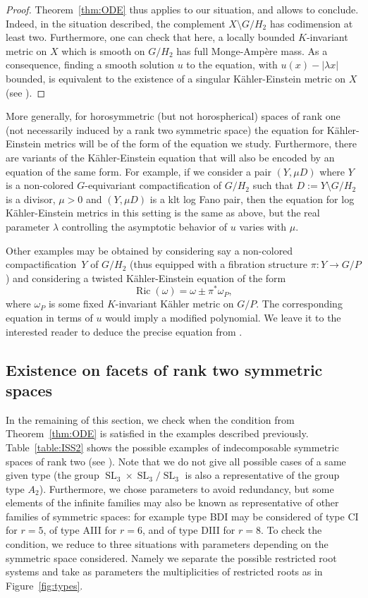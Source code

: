 \documentclass[JEP,XML,SOM,Unicode, NoEqCountersInSection, NoFloatCountersInSection]{cedram}
\theoremstyle{plain}
\theoremstyle{definition}
\DeclareMathOperator{\Ric}{Ric}
\DeclareMathOperator{\SL}{SL}
\begin{document}
\begin{proof}
Theorem~\ref{thm:ODE} thus applies to our situation, and allows to conclude.
Indeed, in the situation described, the complement $X\setminus G/H_2$ has
codimension at least two. Furthermore, one can check that here, a locally
bounded $K$-invariant metric on $X$ which is smooth on $G/H_2$ has full Monge-Ampère mass.
As a consequence, finding a smooth solution $u$ to the equation, with $u(x)-|\lambda x|$
bounded, is equivalent to the existence of a singular Kähler-Einstein metric on $X$
(see \cite[\S3]{BBEGZ}).
\end{proof}

More generally, for horosymmetric (but not horospherical) spaces of rank one
(not necessarily induced by a rank two symmetric space) the equation for
Kähler-Einstein metrics will be of the form of the
equation we study. Furthermore, there are variants of the Kähler-Einstein equation
that will also be encoded by an equation of the same form.
For example, if we consider a pair $(Y,\mu D)$ where $Y$ is a non-colored $G$\nobreakdash-equivariant
compactification of $G/H_2$ such that $D:=Y\setminus G/H_2$ is a divisor, $\mu>0$
and $(Y,\mu D)$ is a klt log Fano pair, then the equation for log Kähler-Einstein
metrics in this setting is the same as above, but the real parameter $\lambda$
controlling the asymptotic behavior of $u$ varies with $\mu$.

Other examples may be obtained by considering say a non-colored compactification~$Y$ of
$G/H_2$ (thus equipped with a fibration structure $\pi:Y\to G/P$)
and considering a twisted Kähler-Einstein equation of the form
\[ \Ric(\omega)=\omega\pm \pi^*\omega_P, \]
where $\omega_P$ is some fixed $K$-invariant Kähler metric on $G/P$.
The corresponding equation in terms of $u$ would imply a modified polynomial.
We leave it to the interested reader to deduce the precise equation from
\cite{DelHoro}.

\subsection{Existence on facets of rank two symmetric spaces}
\label{sec:checks}

In the remaining of this section, we check when the condition from Theorem~\ref{thm:ODE}
is satisfied in the examples described previously.
Table~\ref{table:ISS2} shows the possible examples of
indecomposable symmetric spaces of rank two (see \cite[p.\,532]{Hel78}).
Note that we do not give all possible
cases of a same given type (\eg the group $\SL_3\times \SL_3/\SL_3$ is also a representative
of the group type $A_2$).
Furthermore, we chose parameters to avoid redundancy, but some elements of the infinite
families may also be known as representative of other families of symmetric spaces:
for example type BDI may be considered of type CI for $r=5$, of type AIII for $r=6$,
and of type DIII for $r=8$.
To check the condition, we reduce to three situations with parameters depending on
the symmetric space considered. Namely we separate the possible restricted root systems
and take as parameters the multiplicities of restricted roots as in Figure~\ref{fig:types}.
\end{document}

